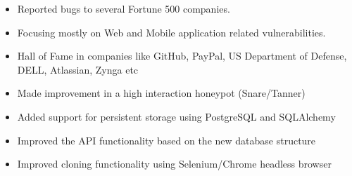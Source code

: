 \documentclass[10pt,a4paper,ragged2e]{altacv}
\begin{document}

  \begin{fullwidth}
  \makecvheader
  \end{fullwidth}



  \begin{itemize}

  \item Reported bugs to several Fortune 500 companies.
  \item Focusing mostly on Web and Mobile application related vulnerabilities.
  \item Hall of Fame in companies like GitHub, PayPal, US Department of Defense, DELL, Atlassian, Zynga etc

  \end{itemize}

  \divider

  \begin{itemize}
  \item Made improvement in a high interaction honeypot (Snare/Tanner)

  \item Added support for persistent storage using PostgreSQL and SQLAlchemy
  
  \item Improved the API functionality based on the new database structure

  \item Improved cloning functionality using Selenium/Chrome headless browser

  \end{itemize}
\end{document}
